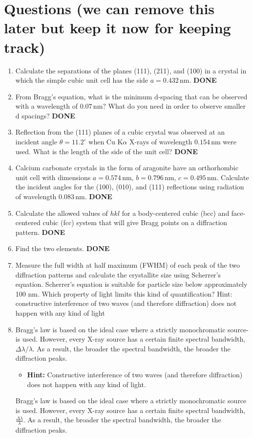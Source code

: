 \section*{Questions (we can remove this later but keep it now for keeping track)}

\begin{enumerate}
    \item Calculate the separations of the planes (111), (211), and (100) in a crystal in which the simple cubic unit cell has the side \( a = 0.432 \, \text{nm} \). \textbf{DONE}
    \item From Bragg’s equation, what is the minimum d-spacing that can be observed with a wavelength of \( 0.07 \, \text{nm} \)? What do you need in order to observe smaller d spacings? \textbf{DONE}
    \item Reflection from the (111) planes of a cubic crystal was observed at an incident angle \( \theta = 11.2^\circ \) when Cu K\(\alpha\) X-rays of wavelength \( 0.154 \, \text{nm} \) were used. What is the length of the side of the unit cell? \textbf{DONE}
    \item Calcium carbonate crystals in the form of aragonite have an orthorhombic unit cell with dimensions \( a = 0.574 \, \text{nm} \), \( b = 0.796 \, \text{nm} \), \( c = 0.495 \, \text{nm} \). Calculate the incident angles for the (100), (010), and (111) reflections using radiation of wavelength \( 0.083 \, \text{nm} \). \textbf{DONE}
    \item Calculate the allowed values of \( hkl \) for a body-centered cubic (bcc) and face-centered cubic (fcc) system that will give Bragg points on a diffraction pattern. \textbf{DONE}
    \item Find the two elements. \textbf{DONE}
    \item Measure the full width at half maximum (FWHM) of each peak of the two
    diffraction patterns and calculate the crystallite size using Scherrer’s equation. Scherrer’s
    equation is suitable for particle size below approximately 100 nm. Which property of
    light limits this kind of quantification? Hint: constructive interference of two waves (and
    therefore diffraction) does not happen with any kind of light
    \item Bragg’s law is based on the ideal case where a strictly monochromatic source-
    is used. However, every X-ray source has a certain finite spectral bandwidth, $\Delta\lambda/\lambda$. As
    a result, the broader the spectral bandwidth, the broader the diffraction peaks. 
    \begin{itemize}
        \item \textbf{Hint:} Constructive interference of two waves (and therefore diffraction) does not happen with any kind of light.
    \end{itemize}
    Bragg’s law is based on the ideal case where a strictly monochromatic source is used. However, every X-ray source has a certain finite spectral bandwidth, \( \frac{\Delta \lambda}{\lambda} \). As a result, the broader the spectral bandwidth, the broader the diffraction peaks.
    

\end{enumerate}
